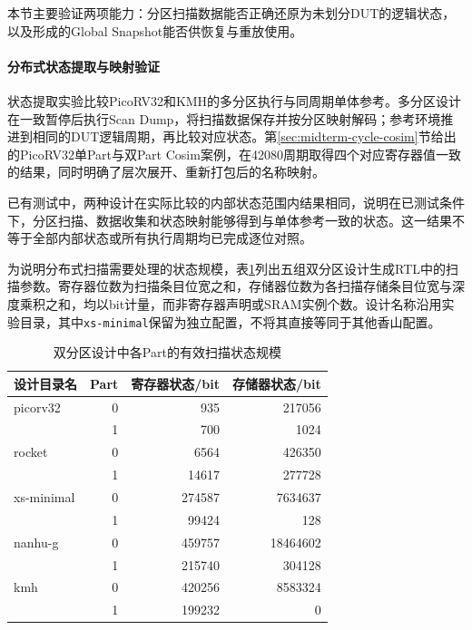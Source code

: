本节主要验证两项能力：分区扫描数据能否正确还原为未划分DUT的逻辑状态，以及形成的Global Snapshot能否供恢复与重放使用。

\paragraph{分布式状态提取与映射验证}

状态提取实验比较PicoRV32和KMH的多分区执行与同周期单体参考。多分区设计在一致暂停后执行Scan Dump，将扫描数据保存并按分区映射解码；参考环境推进到相同的DUT逻辑周期，再比较对应状态。第\ref{sec:midterm-cycle-cosim}节给出的PicoRV32单Part与双Part Cosim案例，在42080周期取得四个对应寄存器值一致的结果，同时明确了层次展开、重新打包后的名称映射。

已有测试中，两种设计在实际比较的内部状态范围内结果相同，说明在已测试条件下，分区扫描、数据收集和状态映射能够得到与单体参考一致的状态。这一结果不等于全部内部状态或所有执行周期均已完成逐位对照。


为说明分布式扫描需要处理的状态规模，表\ref{tab:midterm-scan-state}列出五组双分区设计生成RTL中的扫描参数。寄存器位数为扫描条目位宽之和，存储器位数为各扫描存储条目位宽与深度乘积之和，均以bit计量，而非寄存器声明或SRAM实例个数。设计名称沿用实验目录，其中\texttt{xs-minimal}保留为独立配置，不将其直接等同于其他香山配置。

\begin{table}[htbp]
    \centering
    \caption{双分区设计中各Part的有效扫描状态规模}
    \label{tab:midterm-scan-state}
    \small
    \begin{tabular}{@{}lrrr@{}}
        \toprule
        设计目录名      & Part & 寄存器状态/bit & 存储器状态/bit \\
        \midrule
        picorv32   & 0    & 935       & 217056    \\
                   & 1    & 700       & 1024      \\
        rocket     & 0    & 6564      & 426350    \\
                   & 1    & 14617     & 277728    \\
        xs-minimal & 0    & 274587    & 7634637   \\
                   & 1    & 99424     & 128       \\
        nanhu-g    & 0    & 459757    & 18464602  \\
                   & 1    & 215740    & 304128    \\
        kmh        & 0    & 420256    & 8583324   \\
                   & 1    & 199232    & 0         \\
        \bottomrule
    \end{tabular}
\end{table}


